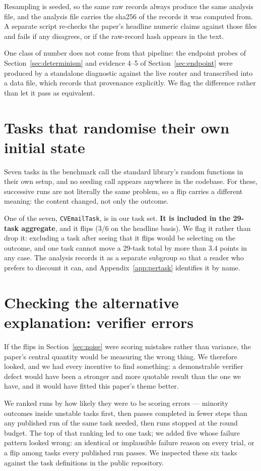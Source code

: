 \noindent Resampling is seeded, so the same raw records always produce the same
analysis file, and the analysis file carries the sha256 of the records it was
computed from. A separate script re-checks the paper's headline numeric claims against those
files and fails if any disagrees, or if the raw-record hash appears in the
text.

\noindent One class of number does not come from that pipeline: the endpoint
probes of Section~\ref{sec:determinism} and evidence 4--5 of
Section~\ref{sec:endpoint} were produced by a standalone diagnostic against the
live router and transcribed into a data file, which records that provenance
explicitly. We flag the difference rather than let it pass as equivalent.

\section{Tasks that randomise their own initial state}
\label{app:randomised}
Seven tasks in the benchmark call the standard library's random functions in
their own setup, and no seeding call appears anywhere in the codebase. For
these, successive runs are not literally the same problem, so a flip carries a
different meaning: the content changed, not only the outcome.

One of the seven, \texttt{CVEmailTask}, is in our task set. \textbf{It is
included in the 29-task aggregate}, and it flips (3/6 on the headline basis).
We flag it rather than drop it: excluding a task after seeing that it flips
would be selecting on the outcome, and one task cannot move a 29-task total by
more than 3.4 points in any case. The analysis records it as a separate
subgroup so that a reader who prefers to discount it can, and
Appendix~\ref{app:pertask} identifies it by name.

\section{Checking the alternative explanation: verifier errors}
\label{app:checker}
If the flips in Section~\ref{sec:noise} were scoring mistakes rather than
variance, the paper's central quantity would be measuring the wrong thing. We
therefore looked, and we had every incentive to find something: a demonstrable
verifier defect would have been a stronger and more quotable result than the
one we have, and it would have fitted this paper's theme better.

We ranked runs by how likely they were to be scoring errors --- minority
outcomes inside unstable tasks first, then passes completed in fewer steps than
any published run of the same task needed, then runs stopped at the round
budget. The top of that ranking led to one task; we added five whose failure
pattern looked wrong: an identical or implausible failure reason on every
trial, or a flip among tasks every published run passes. We inspected these six
tasks against the task definitions in the public repository.

